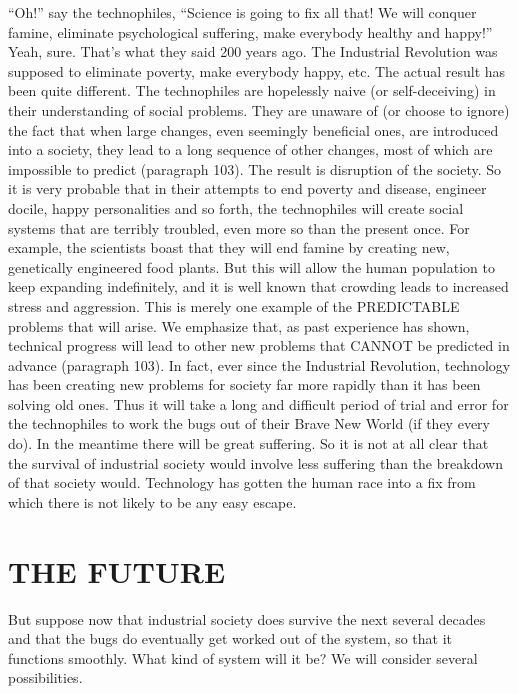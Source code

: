  “Oh!” say the technophiles, “Science is going to fix all that! We will conquer famine, eliminate psychological suffering, make everybody healthy and happy!” Yeah, sure. That’s what they said 200 years ago. The Industrial Revolution was supposed to eliminate poverty, make everybody happy, etc. The actual result has been quite different. The technophiles are hopelessly naive (or self-deceiving) in their understanding of social problems. They are unaware of (or choose to ignore) the fact that when large changes, even seemingly beneficial ones, are introduced into a society, they lead to a long sequence of other changes, most of which are impossible to predict (paragraph 103). The result is disruption of the society. So it is very probable that in their attempts to end poverty and disease, engineer docile, happy personalities and so forth, the technophiles will create social systems that are terribly troubled, even more so than the present once. For example, the scientists boast that they will end famine by creating new, genetically engineered food plants. But this will allow the human population to keep expanding indefinitely, and it is well known that crowding leads to increased stress and aggression. This is merely one example of the PREDICTABLE problems that will arise. We emphasize that, as past experience has shown, technical progress will lead to other new problems that CANNOT be predicted in advance (paragraph 103). In fact, ever since the Industrial Revolution, technology has been creating new problems for society far more rapidly than it has been solving old ones. Thus it will take a long and difficult period of trial and error for the technophiles to work the bugs out of their Brave New World (if they every do). In the meantime there will be great suffering. So it is not at all clear that the survival of industrial society would involve less suffering than the breakdown of that society would. Technology has gotten the human race into a fix from which there is not likely to be any easy escape.

\chapter{THE FUTURE}

 But suppose now that industrial society does survive the next several decades and that the bugs do eventually get worked out of the system, so that it functions smoothly. What kind of system will it be? We will consider several possibilities.

